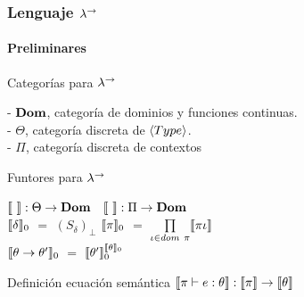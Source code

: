 \documentclass{beamer}
\begin{document}
\begin{frame}
\frametitle{Lenguaje $\lambda^{\rightarrow}$}
\framesubtitle{Preliminares}

\begin{block}{Categorías para $\lambda^{\rightarrow}$}

- $\textbf{Dom}$, categoría de dominios y funciones continuas.\\
- $\Theta$, categoría discreta de $\langle Type \rangle$.\\
- $\Pi$, categoría discreta de contextos

\end{block}

\pause

\begin{block}{Funtores para $\lambda^{\rightarrow}$}

$\llbracket  \  \rrbracket : \Theta \rightarrow \textbf{Dom}$ 
\quad \quad \quad \
$\llbracket  \  \rrbracket : \Pi \rightarrow \textbf{Dom}$\\
$\llbracket \delta \rrbracket_0$ $=$ $(S_\delta)_\bot$
\quad \quad \quad \quad
$\llbracket \pi \rrbracket_0$ $=$ $\prod\limits_{\iota \in dom \ \pi} \llbracket \pi\iota \rrbracket$\\
$\llbracket \theta \rightarrow \theta' \rrbracket_0$ $=$ $\llbracket \theta' \rrbracket_0^{\llbracket \theta \rrbracket_0}$

\end{block}

\pause

\begin{block}{Definición ecuación semántica}
$\llbracket \pi \vdash e : \theta \rrbracket : \llbracket \pi \rrbracket \rightarrow \llbracket \theta \rrbracket$
\end{block}

\end{frame}
\end{document}
